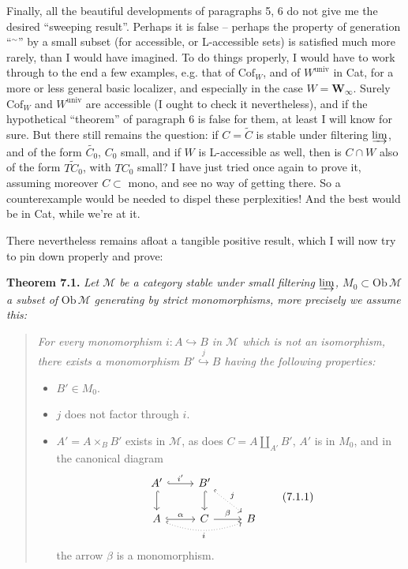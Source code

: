 \documentclass[11pt]{article}
\newcommand{\printedpage}[1]{\marginpar{\footnotesize p.~#1}}
\newcommand{\msp}[1]{\marginpar{\footnotesize [#1]}}
\newcommand{\M}{\mathcal{M}}
\newcommand{\Ob}{\mathrm{Ob}}
\newcommand{\Cof}{\mathrm{Cof}}
\begin{document}
Finally, all the beautiful developments of paragraphs 5, 6 do not give me the desired ``sweeping result''. Perhaps it is false -- perhaps the property of generation
\printedpage{46}
``$^{\sim}$'' by a small subset (for accessible, or L-accessible sets) is satisfied much more rarely, than I would have imagined. To do things properly, I would have to work through to the %
\msp{page 85}
end a few examples, e.g. that of $\Cof_W$, and of $W^{\mathrm{univ}}$ in Cat, for a more or less general basic localizer, and especially in the case $W = \mathbf{W}_{\infty}$. Surely $\Cof_W$ and $W^{\mathrm{univ}}$ are accessible (I ought to check it nevertheless), and if the hypothetical ``theorem'' of paragraph 6 is false for them, at least I will know for sure. But there still remains the question: if $C = \widetilde{C}$ is stable under filtering $\varinjlim$, and of the form $\widetilde{C_0}$, $C_0$ small, and if $W$ is L-accessible as well, then is $C \cap W$ also of the form $\widetilde{TC_0}$, with $TC_0$ small? I have just tried once again to prove it, assuming moreover $C \subset$ mono, and see no way of getting there. So a counterexample would be needed to dispel these perplexities! And the best would be in Cat, while we're at it.

There nevertheless remains afloat a tangible positive result, which I will now try to pin down properly and prove:

\msp{page 86}
\textbf{Theorem 7.1.} \textit{Let $\M$ be a category stable under small filtering $\varinjlim$, $M_0 \subset \Ob\,\M$ a subset of} $\Ob\,\M$ \textit{generating by strict monomorphisms, more precisely we assume this:}

\begin{quote}
\itshape
For every monomorphism $i : A \hookrightarrow B$ in $\M$ which is not an isomorphism, there exists a monomorphism $B' \overset{j}{\hookrightarrow} B$ having the following properties:
\begin{itemize}
\item[\textup{a)}] $B' \in M_0$.
\item[\textup{b)}] $j$ does not factor through $i$.
\item[\textup{c)}] $A' = A \times_B B'$ exists in $\M$, as does $C = A \amalg_{A'} B'$, $A'$ is in $M_0$, and in the canonical diagram
\[
\begin{tikzcd}
A' \arrow[r, hook, "i'"] \arrow[d, hook] & B' \arrow[d, hook] \arrow[dr, hook, dotted, "j"] & \\
A \arrow[r, hook, "\alpha"] \arrow[rr, hook, dotted, bend right=20, "i"'] & C \arrow[r, "\beta"] & B
\end{tikzcd}
\tag*{(7.1.1)}
\]
the arrow $\beta$ is a monomorphism.
\end{itemize}
\end{quote}
\end{document}
